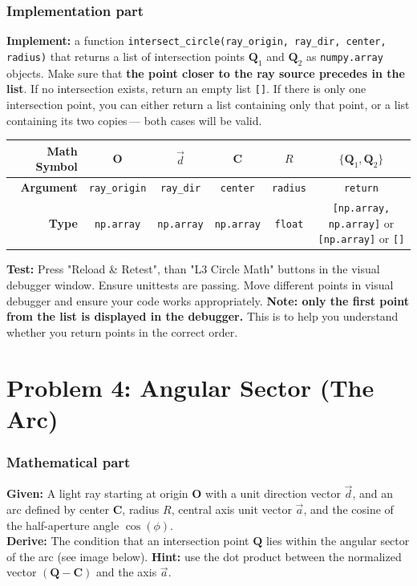 \documentclass[11pt]{article}
\begin{document}
\subsubsection*{Implementation part}\textbf{Implement:} a function \lstinline|intersect_circle(ray_origin, ray_dir, center, radius)| that returns a list of intersection points $\mathbf{Q}_1$ and $\mathbf{Q}_2$ as \lstinline|numpy.array| objects. Make sure that \textbf{the point closer to the ray source precedes in the list}. If no intersection exists, return an empty list \lstinline|[]|. If there is only one intersection point, you can either return a list containing only that point, or a list containing its two copies\,--- both cases will be valid.
\begin{center}
\renewcommand{\arraystretch}{2.0}
\begin{tabular}{r | c | c | c | c | c}
\toprule
\textbf{Math Symbol} & $\mathbf{O}$ & $\vec{d}$ & $\mathbf{C}$ & $R$ & $\{\mathbf{Q}_1, \mathbf{Q}_2\}$ \\
\midrule\textbf{Argument} & \lstinline|ray_origin| & \lstinline|ray_dir| & \lstinline|center| & \lstinline|radius| & \lstinline|return| \\
\midrule
\textbf{Type} & \lstinline|np.array| & \lstinline|np.array| & \lstinline|np.array| & \lstinline|float| & \parbox{5cm}{\lstinline|[np.array, np.array]| or\\ \lstinline|[np.array]| or \lstinline|[]|} \\
\bottomrule
\end{tabular}
\end{center}
\textbf{Test:} Press "Reload \& Retest", than "L3 Circle Math" buttons in the visual debugger window. Ensure unittests are passing. Move different points in visual debugger and ensure your code works appropriately. \textbf{Note: only the first point from the list is displayed in the debugger.} This is to help you understand whether you return points in the correct order.


\section*{Problem 4: Angular Sector (The Arc)}

\subsubsection*{Mathematical part}
\textbf{Given:} A light ray starting at origin $\mathbf{O}$ with a unit direction vector $\vec{d}$, and an arc defined by center $\mathbf{C}$, radius $R$, central axis unit vector $\vec{a}$, and the cosine of the half-aperture angle $\cos(\phi)$. \\
\textbf{Derive:} The condition that an intersection point $\mathbf{Q}$ lies within the angular sector of the arc (see image below). \textbf{Hint:} use the dot product between the normalized vector $(\mathbf{Q} - \mathbf{C})$ and the axis $\vec{a}$.
\end{document}
